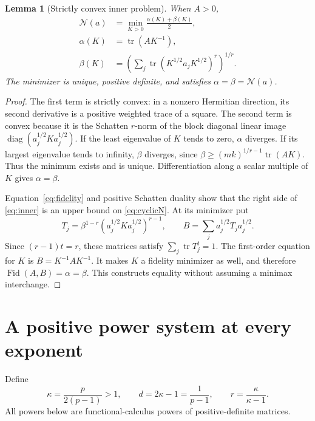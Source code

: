 \documentclass[11pt]{article}
\newcommand{\tr}{\operatorname{tr}}
\newcommand{\Fid}{\operatorname{Fid}}
\newcommand{\diag}{\operatorname{diag}}
\newcommand{\N}{\mathcal N}
\newtheorem{lemma}[theorem]{Lemma}
\theoremstyle{remark}\newtheorem{remark}[theorem]{Remark}
\begin{document}
\begin{lemma}[Strictly convex inner problem]\label{lem:inner}
When \(A>0\),
\begin{equation}\label{eq:inner}
 \begin{aligned}
 \N(a)&=\min_{K>0}\frac{\alpha(K)+\beta(K)}2,\\
 \alpha(K)&=\tr(AK^{-1}),\\
 \beta(K)&=\left(\sum_j\tr(K^{1/2}a_jK^{1/2})^r\right)^{1/r}.
 \end{aligned}
\end{equation}
The minimizer is unique, positive definite, and satisfies \(\alpha=\beta=\N(a)\).
\end{lemma}
\begin{proof}
The first term is strictly convex: in a nonzero Hermitian direction, its second derivative is a positive weighted trace of a square. The second term is convex because it is the Schatten \(r\)-norm of the block diagonal linear image \(\diag(a_j^{1/2}Ka_j^{1/2})\). If the least eigenvalue of \(K\) tends to zero, \(\alpha\) diverges. If its largest eigenvalue tends to infinity, \(\beta\) diverges, since \(\beta\ge(mk)^{1/r-1}\tr(AK)\). Thus the minimum exists and is unique. Differentiation along a scalar multiple of \(K\) gives \(\alpha=\beta\).

Equation~\eqref{eq:fidelity} and positive Schatten duality show that the right side of \eqref{eq:inner} is an upper bound on \eqref{eq:cyclicN}. At its minimizer put
\[
 T_j=\beta^{1-r}(a_j^{1/2}Ka_j^{1/2})^{r-1},\qquad
 B=\sum_ja_j^{1/2}T_ja_j^{1/2}.
\]
Since \((r-1)t=r\), these matrices satisfy \(\sum_j\tr T_j^t=1\). The first-order equation for \(K\) is \(B=K^{-1}AK^{-1}\). It makes \(K\) a fidelity minimizer as well, and therefore \(\Fid(A,B)=\alpha=\beta\). This constructs equality without assuming a minimax interchange.
\end{proof}

\section{A positive power system at every exponent}
Define
\[
 \kappa=\frac p{2(p-1)}>1,\qquad d=2\kappa-1=\frac1{p-1},
 \qquad r=\frac\kappa{\kappa-1}.
\]
All powers below are functional-calculus powers of positive-definite matrices.
\end{document}
